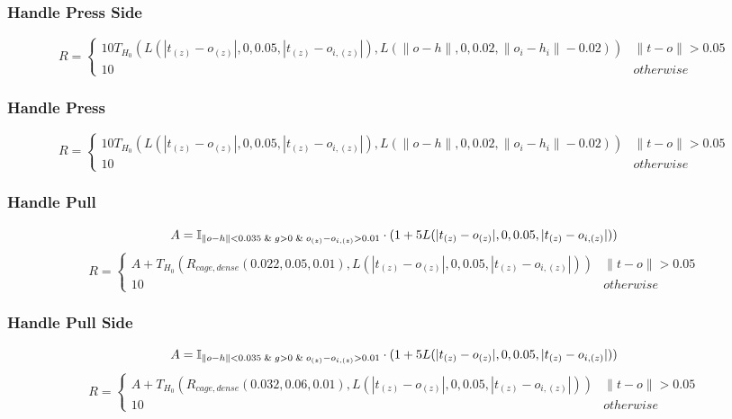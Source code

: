 {\subsubsection{Handle Press Side}
\[
R=\left\{
    \begin{array}{ll}
    10T_{H_0}(
        L(| t_{(z)} - o_{(z)} |, 0, 0.05, | t_{(z)} - o_{i,(z)} |),
        L(\lVert o - h \rVert, 0, 0.02, \lVert o_i - h_i \rVert - 0.02)
    ) & \lVert t - o \rVert > 0.05 \\
    10 & otherwise
    \end{array}
\right.
\]

\subsubsection{Handle Press}
\[
R=\left\{
    \begin{array}{ll}
    10T_{H_0}(
        L(| t_{(z)} - o_{(z)} |, 0, 0.05, | t_{(z)} - o_{i,(z)} |),
        L(\lVert o - h \rVert, 0, 0.02, \lVert o_i - h_i \rVert - 0.02)
    ) & \lVert t - o \rVert > 0.05 \\
    10 & otherwise
    \end{array}
\right.
\]

\subsubsection{Handle Pull}
\[
A=\mathbb{I}_{\lVert o - h \rVert < 0.035 \And g > 0 \And o_{(z)} - o_{i,(z)} > 0.01} \cdot
    (1 + 5L(| t_{(z)} - o_{(z)} |, 0, 0.05, | t_{(z)} - o_{i,(z)} |))
\]
\[
R=\left\{
    \begin{array}{ll}
        A + 
        T_{H_0}\left(
            R_{cage,dense}(0.022,0.05,0.01),
            L(| t_{(z)} - o_{(z)} |, 0, 0.05, | t_{(z)} - o_{i,(z)} |)
        \right)
            & \lVert t - o \rVert > 0.05 \\
        10
            & otherwise
    \end{array}
\right.
\]

\subsubsection{Handle Pull Side}
\[
A=\mathbb{I}_{\lVert o - h \rVert < 0.035 \And g > 0 \And o_{(z)} - o_{i,(z)} > 0.01} \cdot
    (1 + 5L(| t_{(z)} - o_{(z)} |, 0, 0.05, | t_{(z)} - o_{i,(z)} |))
\]
\[
R=\left\{
    \begin{array}{ll}
        A + 
        T_{H_0}\left(
            R_{cage,dense}(0.032,0.06,0.01),
            L(| t_{(z)} - o_{(z)} |, 0, 0.05, | t_{(z)} - o_{i,(z)} |)
        \right)
            & \lVert t - o \rVert > 0.05 \\
        10
            & otherwise
    \end{array}
\right.
\]

}
